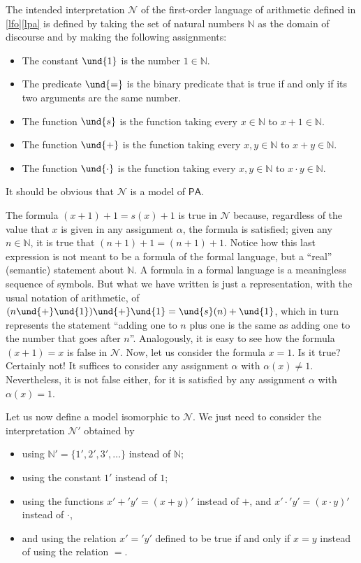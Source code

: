 \begin{example}
The intended interpretation $\mathcal{N}$ of the first-order language of arithmetic defined in \ref{lfo}\ref{lpa} is defined by taking the set of natural numbers $\mathbb{N}$ as the domain of discourse and by making the following assignments:
\begin{itemize}
\item The constant $\und{1}$ is the number $1\in \mathbb{N}$.
\item The predicate $\und{=}$ is the binary predicate that is true if and only if its two arguments are the same number.
\item The function $\und{s}$ is the function taking every $x\in \mathbb{N}$ to $x+1\in\mathbb{N}$.
\item The function $\und{+}$ is the function taking every $x,y\in \mathbb{N}$ to $x+y\in\mathbb{N}$.
\item The function $\und{\cdot}$ is the function taking every $x,y\in \mathbb{N}$ to $x\cdot y \in \mathbb{N}$.
\end{itemize}
It should be obvious that $\mathcal{N}$ is a model of $\mathsf{PA}$.

The formula $(x+1) + 1= s(x) + 1$ is true in $\mathcal{N}$ because, regardless of the value that $x$ is given in any assignment $\alpha$, the formula is satisfied; given any $n\in \mathbb{N}$, it is true that $(n+1) + 1 = (n+1) + 1$. Notice how this last expression is not meant to be a formula of the formal language, but a ``real'' (semantic) statement about $\mathbb{N}$.
A formula in a formal language is a meaningless sequence of symbols. But what we have written is just a representation, with the usual notation of arithmetic, of $(n\und{+}\und{1})\und{+}\und{1} = \und{s}(n)+\und{1}$, which in turn represents the statement ``adding one to $n$ plus one is the same as adding one to the number that goes after $n$''.
Analogously, it is easy to see how the formula $(x+1) = x$ is false in $\mathcal{N}$. Now, let us consider the formula $x = 1$. Is it true? Certainly not! It suffices to consider any assignment $\alpha$ with $\alpha(x) \neq 1$.
Nevertheless, it is not false either, for it is satisfied by any assignment $\alpha$ with $\alpha(x) = 1$. 

Let us now define a model isomorphic to $\mathcal{N}$. We just need to consider the interpretation $\mathcal{N}'$ obtained by
\begin{itemize}
\item using $\mathbb{N}'=\{1',2',3',\ldots\}$ instead of $\mathbb{N}$;
\item using the constant $1'$ instead of $1$;
\item using the functions $x'+' y' = (x+y)'$ instead of $+$, and  $x'\cdot' y' = (x\cdot y)'$ instead of $\cdot$,
\item and using the relation $x' =' y'$ defined to be true if and only if $x = y$ instead of using the relation $=$.
\end{itemize}


\end{example}

